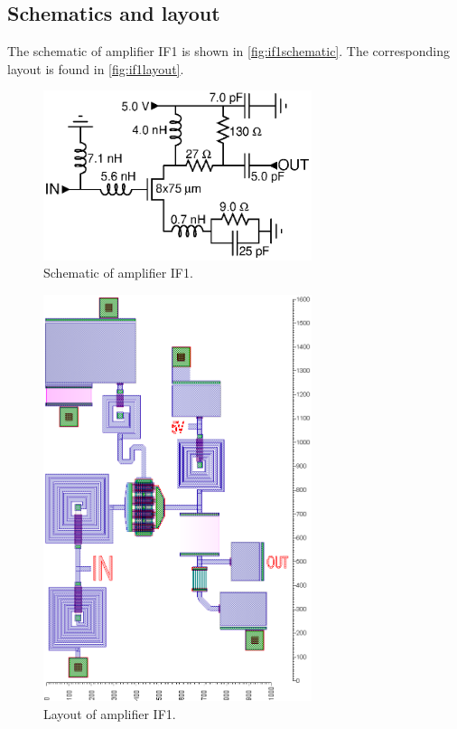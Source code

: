 		\subsection{Schematics and layout}
			The schematic of amplifier IF1 is shown in \autoref{fig:if1schematic}. The corresponding layout is found in \autoref{fig:if1layout}.

			\begin{figure}[hbt!]
				\centering
				\includegraphics[width=0.7\textwidth]{fig/amplifiers/if1/sch_if1}
				\caption[Amplifier IF1 schematic.]{Schematic of amplifier IF1.}\label{fig:if1schematic}
			\end{figure}

			\begin{figure}[hbt!]
				\centering
				\includegraphics[width=0.7\textwidth]{fig/amplifiers/if1/layout}
				\caption[Amplifier IF1 layout.]{Layout of amplifier IF1.\scalemum}\label{fig:if1layout}
			\end{figure}

